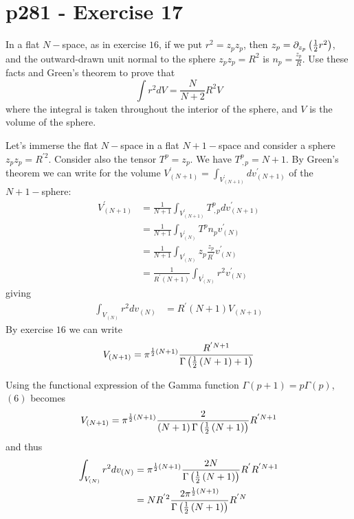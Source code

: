 \section{p281 - Exercise 17}
\begin{tcolorbox}
In a flat $N-$space, as in exercise $16$, if we put $r^2=z_pz_p$, then $z_p=\partial_{z_p}\left(\frac{1}{2} r^2\right)$, and the outward-drawn unit normal to the sphere $z_p z_p= R^2$ is $n_p= \frac{z_p}{R}$. Use these facts and Green's theorem to prove that
$$\int r^2dV = \frac{N}{N+2}R^2 V$$ where the integral is taken throughout the interior of the sphere, and $V$ is the volume of the sphere.
\end{tcolorbox}
Let's immerse the  flat $N-$space in a flat $N+1-$space and consider a sphere $z_p z_p= R^{'2}$. Consider also the tensor $T^p=z_p$. We have  $T^p_{\ ,p}= N+1$. By Green's theorem we can write for the volume $V^{'}_{(N+1)} = \int_{V^{'}_{(N+1)}} dv^{'}_{(N+1)} $ of the $N+1-$sphere:
\begin{align}
V^{'}_{(N+1)} &= \frac{1}{N+1}\int_{V^{'}_{(N+1)}}T^p_{\ ,p} dv^{'}_{(N+1)} \\
&=\frac{1}{N+1}\int_{V^{'}_{(N)}} T^p n_p v^{'}_{(N)} \\
&=\frac{1}{N+1}\int_{V^{'}_{(N)}} z_p\frac{z_p}{R^{'}} v^{'}_{(N)} \\
&=\frac{1}{R^{'}\left(N+1\right)}\int_{V^{'}_{(N)} } r^2 v^{'}_{(N)}
\end{align}
giving
\begin{align}
\int_{V_{(N)}} r^2 dv_{(N)}&=R^{'}\left(N+1\right)V_{(N+1)} 
\end{align}
By exercise $16$ we can write
\begin{align}
V_{(N+1)} = \pi^{\frac{1}{2}\left(N+1\right)} \frac{R^{'N+1}}{\Gamma \left(\frac{1}{2}\left(N+1\right)+1\right)}
\end{align} 

Using the functional expression of the Gamma function $\Gamma\left(p+1\right) = p\Gamma\left(p\right)$, 
$(6)$ becomes
\begin{align}
V_{(N+1)} = \pi^{\frac{1}{2}\left(N+1\right)} \frac{2}{\left(N+1\right)\Gamma \left(\frac{1}{2}\left(N+1\right)\right)}R^{'N+1}
\end{align}  
and thus 
\begin{align}
\int_{V_{(N)}} r^2 dv_{(N)}&=\pi^{\frac{1}{2}\left(N+1\right)} \frac{2N}{\Gamma \left(\frac{1}{2}\left(N+1\right)\right)}R^{'}R^{'N+1}\\
&=N R^{'2 }\frac{2\pi^{\frac{1}{2}\left(N+1\right)}}{\Gamma \left(\frac{1}{2}\left(N+1\right)\right)}R^{'N}
\end{align}


